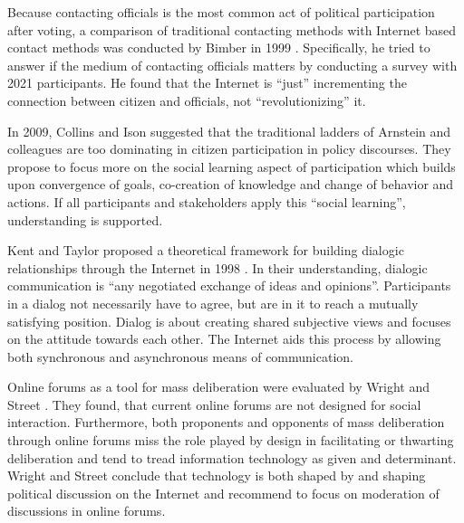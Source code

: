 Because contacting officials is the most common act of political participation after voting, a comparison of traditional contacting methods with Internet based contact methods was conducted by Bimber in 1999 \cite{Bimber1999_Citizen_communication_with_government}. Specifically, he tried to answer if the medium of contacting officials matters by conducting a survey with 2021 participants. He found that the Internet is ``just'' incrementing the connection between citizen and officials, not ``revolutionizing'' it.

In 2009, Collins and Ison \cite{Collins2009_social_learning} suggested that the traditional ladders of Arnstein and colleagues are too dominating in citizen participation in policy discourses. They propose to focus more on the social learning aspect of participation which builds upon convergence of goals, co-creation of knowledge and change of behavior and actions. If all participants and stakeholders apply this ``social learning'', understanding is supported.


Kent and Taylor proposed a theoretical framework for building dialogic relationships through the Internet in 1998 \cite{Kent1998_dialogic_relationships_through_www}. In their understanding, dialogic communication is ``any negotiated exchange of ideas and opinions''. Participants in a dialog not necessarily have to agree, but are in it to reach a mutually satisfying position. Dialog is about creating shared subjective views and focuses on the attitude towards each other. The Internet aids this process by allowing both synchronous and asynchronous means of communication.



Online forums as a tool for mass deliberation were evaluated by Wright and Street \cite{Wright2007_deliberation_design}. They found, that current online forums are not designed for social interaction. Furthermore, both proponents and opponents of mass deliberation through online forums miss the role played by design in facilitating or thwarting deliberation and tend to tread information technology as given and determinant. Wright and Street conclude that technology is both shaped by and shaping political discussion on the Internet and recommend to focus on moderation of discussions in online forums.



